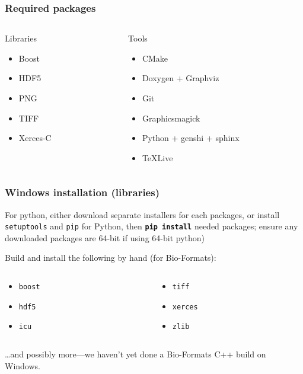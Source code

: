 \documentclass{beamer}
\newcommand{\cmd}[1]{\textbf{\texttt{#1}}}
\newcommand{\pkg}[1]{\texttt{#1}}
\begin{document}
\begin{frame}
  \frametitle{Required packages}
  \scriptsize
  \begin{columns}
    \begin{column}{.5\linewidth}
      Libraries
      \begin{itemize}
      \item[] Boost
      \item[] HDF5
      \item[] PNG
      \item[] TIFF
      \item[] Xerces-C
      \end{itemize}
      \end{column}
    \begin{column}{.5\linewidth}
      Tools
      \begin{itemize}
      \item[] CMake
      \item[] Doxygen + Graphviz
      \item[] Git
      \item[] Graphicsmagick
      \item[] Python + genshi + sphinx
      \item[] \TeX{}Live
    \end{itemize}
    \end{column}
  \end{columns}
\end{frame}

\begin{frame}
  \frametitle{Windows installation (libraries)}

For python, either download separate installers for each packages, or
install \pkg{setuptools} and \pkg{pip} for Python, then \cmd{pip
  install} needed packages; ensure any downloaded packages are 64-bit
if using 64-bit python)
\bigskip

Build and install the following by hand (for Bio-Formats):
  \begin{columns}
    \begin{column}{.5\linewidth}
      \begin{itemize}
      \item[] \pkg{boost}
      \item[] \pkg{hdf5}
      \item[] \pkg{icu}
      \end{itemize}
    \end{column}
    \begin{column}{.5\linewidth}
      \begin{itemize}
      \item[] \pkg{tiff}
      \item[] \pkg{xerces}
      \item[] \pkg{zlib}
      \end{itemize}
    \end{column}
  \end{columns}
…and possibly more—we haven't yet done a Bio-Formats C++ build on Windows.
\end{frame}
\end{document}
